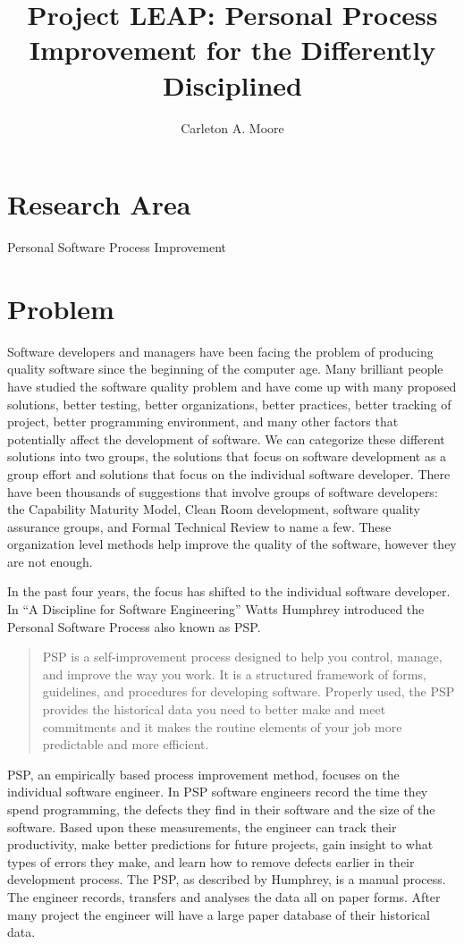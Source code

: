 \documentclass[12pt]{article}
\begin{document}
\title{Project LEAP: Personal Process Improvement for the Differently Disciplined}
\author{Carleton A. Moore}
\maketitle

\section*{Research Area}
Personal Software Process Improvement
\section*{Problem}

Software developers and managers have been facing the problem of producing
quality software since the beginning of the computer age.  Many brilliant
people have studied the software quality problem and have come up with many
proposed solutions, better testing, better organizations, better practices,
better tracking of project, better programming environment, and many other
factors that potentially affect the development of software.  We can
categorize these different solutions into two groups, the solutions that
focus on software development as a group effort and solutions that focus on
the individual software developer.  There have been thousands of
suggestions that involve groups of software developers: the Capability
Maturity Model, Clean Room development, software quality assurance groups,
and Formal Technical Review to name a few.  These organization level
methods help improve the quality of the software, however they are not
enough.

In the past four years, the focus has shifted to the individual software
developer.  In ``A Discipline for Software Engineering''\cite{Humphrey95}
Watts Humphrey introduced the Personal Software Process also known as PSP.
\begin{quote}
  PSP is a self-improvement process designed to help you control, manage,
  and improve the way you work.  It is a structured framework of forms,
  guidelines, and procedures for developing software.  Properly used, the
  PSP provides the historical data you need to better make and meet
  commitments and it makes the routine elements of your job more
  predictable and more efficient.\cite{Humphrey95}
\end{quote}
PSP, an empirically based process improvement method, focuses on the
individual software engineer.  In PSP software engineers record the time
they spend programming, the defects they find in their software and the
size of the software.  Based upon these measurements, the engineer can track
their productivity, make better predictions for future projects, gain
insight to what types of errors they make, and learn how to remove defects
earlier in their development process.  The PSP, as described by Humphrey,
is a manual process.  The engineer records, transfers and analyses the data
all on paper forms.  After many project the engineer will have a large
paper database of their historical data.
\end{document}
